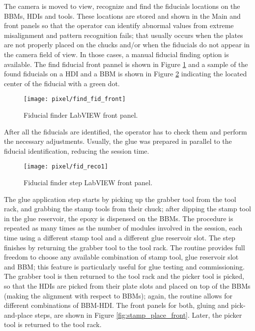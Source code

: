 The camera is moved to view, recognize and find the fiducials locations on the BBMs, HDIs and tools. These locations are stored and shown in the Main and  front panels so that the operator can identify abnormal values from extreme misalignment and pattern recognition fails; that usually occurs when the plates are not properly placed on the chucks and/or when the fiducials do not appear in the camera field of view. In those cases, a manual fiducial finding option is available. The find fiducial front pannel is shown in Figure \ref{fig:find_fid_front} and a sample of the found fiducials on a HDI and a BBM is shown in Figure \ref{fig:fid_reco} indicating the located center of the fiducial with a green dot. 

\begin{landscape}
\begin{figure}[h]
\centering
    \vspace{-2.9cm}
    \hspace{-1cm}
    \texttt{[image: pixel/find\_fid\_front]}
    \caption[Fiducial finder LabVIEW front panel]{Fiducial finder LabVIEW front panel.}\label{fig:find_fid_front}
    \vspace{-2cm}
    \hspace{-2cm}
\end{figure}
\end{landscape}

After all the fiducials are identified, the operator has to check them and perform the necessary adjustments. Usually, the glue was prepared in parallel to the fiducial identification, reducing the session time.

\begin{figure}[h]
\centering
  \texttt{[image: pixel/fid\_reco1]}
 \caption[Fiducial finder step LabVIEW front panel]{Fiducial finder step LabVIEW front panel.}\label{fig:fid_reco}
\end{figure}

The glue application step starts by picking up the grabber tool from the tool rack, and grabbing the stamp tools from their chuck; after dipping the stamp tool in the glue reservoir, the epoxy is dispensed on the BBMs. The procedure is repeated as many times as the number of modules involved in the session, each time using a different stamp tool and a different glue reservoir slot. The step finishes by returning the grabber tool to the tool rack. The routine provides full freedom to choose any available combination of stamp tool, glue reservoir slot and BBM; this feature is particularly useful for glue testing and commissioning. The grabber tool is then returned to the tool rack and the picker tool is picked, so that the HDIs are picked from their plate slots and placed on top of the BBMs (making the alignment with respect to BBMs); again, the routine allows for different combinations of BBM-HDI. The front panels for both, gluing and pick-and-place steps, are shown in Figure \ref{fig:stamp_place_front}. Later, the picker tool is returned to the tool rack.

